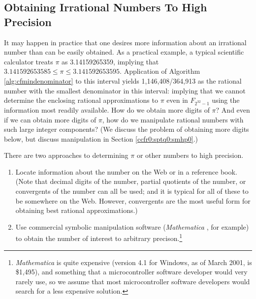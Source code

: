 \subsection{Obtaining Irrational Numbers To High Precision}
\label{ccfr0:sptq0:ssoin0}

It may happen in practice that one desires more information about an
irrational number than can be easily obtained.  As a practical example,
a typical scientific calculator treats $\pi$ as 3.14159265359, implying that 
$3.141592653585 \leq \pi \leq 3.141592653595$.  Application of 
Algorithm \ref{alg:cfmindenominator} to this
interval yields 1,146,408/364,913 as the rational number with the
smallest denominator in this interval:  implying that we cannot determine the 
enclosing rational approximations to $\pi$ even in $F_{2^{32}-1}$ using
the information most readily available.  How do we obtain more digits of $\pi$?
And even if we can obtain more digits of $\pi$, how do we manipulate rational
numbers with such large integer components?  (We discuss the problem of obtaining
more digits below, but discuss manipulation in Section \ref{ccfr0:sptq0:smhp0}.)

There are two approaches to determining $\pi$ or other numbers to
high precision.

\begin{enumerate}

\item Locate information about the number on the Web or in a reference
      book.  (Note that decimal digits of the number, partial quotients
	  of the number, or convergents of the number can all be used; and it
	  is typical for all of these to be somewhere on the Web.  However,
	  convergents are the most useful form for obtaining best rational
	  approximations.)

\item Use commercial symbolic manipulation software (\emph{Mathematica}
      \cite{bibref:s:wolframmathematica}, 
      for example) to
      obtain the number of interest to arbitrary 
      precison.\footnote{\label{footnote:ccfr0:sptq0:ssoin0:mathematicaexpensive}\emph{Mathematica}
      \cite{bibref:s:wolframmathematica} is quite expensive (version 4.1 
      for Windows, as of March 2001, is \$1,495), 
      and something that a microcontroller software developer
      would very rarely use, so we assume that most microcontroller software
      developers would search for a less expensive solution.}

\end{enumerate}

